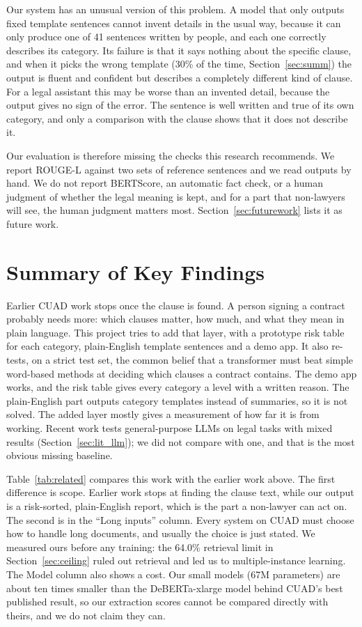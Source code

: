 Our system has an unusual version of this problem. A model that only outputs fixed template sentences cannot invent details in the usual way, because it can only produce one of 41 sentences written by people, and each one correctly describes its category. Its failure is that it says nothing about the specific clause, and when it picks the wrong template (30\% of the time, Section~\ref{sec:summ}) the output is fluent and confident but describes a completely different kind of clause. For a legal assistant this may be worse than an invented detail, because the output gives no sign of the error. The sentence is well written and true of its own category, and only a comparison with the clause shows that it does not describe it.

Our evaluation is therefore missing the checks this research recommends. We report ROUGE-L against two sets of reference sentences and we read outputs by hand. We do not report BERTScore, an automatic fact check, or a human judgment of whether the legal meaning is kept, and for a part that non-lawyers will see, the human judgment matters most. Section~\ref{sec:futurework} lists it as future work.

\section{Summary of Key Findings}
\label{sec:litgap}
Earlier CUAD work stops once the clause is found. A person signing a contract probably needs more: which clauses matter, how much, and what they mean in plain language. This project tries to add that layer, with a prototype risk table for each category, plain-English template sentences and a demo app. It also re-tests, on a strict test set, the common belief that a transformer must beat simple word-based methods at deciding which clauses a contract contains. The demo app works, and the risk table gives every category a level with a written reason. The plain-English part outputs category templates instead of summaries, so it is not solved. The added layer mostly gives a measurement of how far it is from working. Recent work tests general-purpose LLMs on legal tasks with mixed results (Section~\ref{sec:lit_llm}); we did not compare with one, and that is the most obvious missing baseline.

Table~\ref{tab:related} compares this work with the earlier work above. The first difference is scope. Earlier work stops at finding the clause text, while our output is a risk-sorted, plain-English report, which is the part a non-lawyer can act on. The second is in the ``Long inputs'' column. Every system on CUAD must choose how to handle long documents, and usually the choice is just stated. We measured ours before any training: the 64.0\% retrieval limit in Section~\ref{sec:ceiling} ruled out retrieval and led us to multiple-instance learning. The Model column also shows a cost. Our small models (67M parameters) are about ten times smaller than the DeBERTa-xlarge model behind CUAD's best published result, so our extraction scores cannot be compared directly with theirs, and we do not claim they can.

